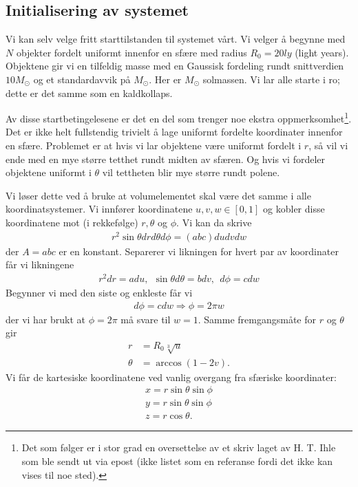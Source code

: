 \documentclass[11pt]{article}
\begin{document}
\begin{multicols}{2}
\subsection{Initialisering av systemet}
\label{sec:init-av-system}
Vi kan selv velge fritt starttilstanden til systemet vårt. Vi velger å
begynne med $N$ objekter fordelt uniformt innenfor en sfære med
radius $R_0=20 ly$ (light years). Objektene gir vi en tilfeldig masse med
en Gaussisk fordeling rundt snittverdien $10M_\odot$ og et standardavvik
på $M_\odot$. Her er $M_\odot$ solmassen. Vi lar alle starte i ro; 
dette er det samme som en kaldkollaps. 

Av disse startbetingelesene er det en del som trenger noe ekstra
oppmerksomhet\footnote{Det som følger er i stor grad en oversettelse
  av et skriv laget av H. T. Ihle som ble sendt ut via epost (ikke
  listet som en referanse fordi det ikke kan vises til noe sted).}. Det er ikke helt fullstendig trivielt å lage uniformt
fordelte koordinater innenfor en sfære. Problemet er at hvis vi lar
objektene være uniformt fordelt i $r$, så vil vi ende med en mye
større tetthet rundt midten av sfæren. Og hvis vi fordeler objektene
uniformt i $\theta$ vil tettheten blir mye større rundt polene. 

Vi løser dette ved å bruke at volumelementet skal være det samme i
alle koordinatsystemer. Vi innfører koordinatene $u, v, w \in [0,1]$
og kobler disse koordinatene mot (i rekkefølge) $r,\theta$ og
$\phi$. Vi kan da skrive 
\begin{align*}
  r^2\sin\theta dr d\theta d\phi = (abc)dudvdw
\end{align*}
der $A=abc$ er en konstant. Separerer vi likningen for hvert par av
koordinater får vi likningene 
\begin{align*}
  r^2dr = adu,\ \ \sin\theta d\theta = bdv,\ \ d\phi = cdw
\end{align*}
Begynner vi med den siste og enkleste får vi 
\begin{align}
  d\phi = cdw\Rightarrow \phi = 2\pi w
\end{align}
der vi har brukt at $\phi=2\pi$ må svare til $w=1$. Samme
fremgangsmåte for $r$ og $\theta$ gir
\begin{align}
  r &= R_0 \sqrt[3]{u}\\
  \theta &= \arccos(1-2v).
\end{align}
Vi får de kartesiske koordinatene ved vanlig overgang fra sfæriske
koordinater:
\begin{align*}
  x = r\sin\theta\sin\phi\\
y = r\sin\theta\sin\phi\\
z = r\cos\theta.
\end{align*}



\end{multicols}
\end{document}
